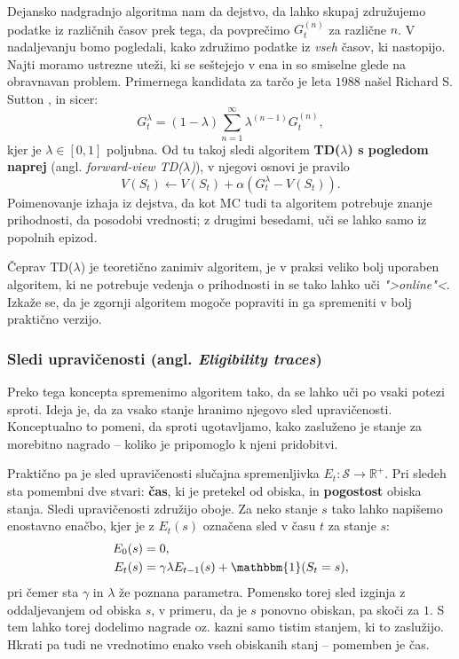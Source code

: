 \documentclass[12pt,a4paper]{amsart}
\theoremstyle{definition} %
\theoremstyle{plain} %
\begin{document}
Dejansko nadgradnjo algoritma nam da dejstvo, da lahko skupaj združujemo podatke iz različnih časov 
prek tega, da povprečimo $G_t^{(n)}$ za različne $n$. V nadaljevanju bomo pogledali, kako združimo 
podatke iz \textit{vseh} časov, ki nastopijo. Najti moramo ustrezne uteži, ki se seštejejo v ena in so 
smiselne glede na obravnavan problem. Primernega kandidata za tarčo je leta $1988$ našel Richard S. 
Sutton \cite{TDlambda}, in sicer:
$$
G_t^\lambda = (1 - \lambda) \sum_{n=1}^\infty \lambda^{(n-1)} G_t^{(n)},
$$
kjer je $\lambda \in [0, 1]$ poljubna. Od tu takoj sledi algoritem \textbf{TD($\lambda$) s pogledom 
naprej} (angl. \textit{forward-view TD($\lambda$)}), v njegovi osnovi je pravilo 
$$
V(S_t) \leftarrow V(S_t) + \alpha (G_t^\lambda - V(S_t)).
$$ 
Poimenovanje izhaja iz dejstva, da kot MC tudi ta algoritem potrebuje znanje prihodnosti, da posodobi 
vrednosti; z drugimi besedami, uči se lahko samo iz popolnih epizod.

Čeprav TD($\lambda$) je teoretično zanimiv algoritem, je v praksi veliko bolj uporaben algoritem, 
ki ne potrebuje vedenja o prihodnosti in se tako lahko uči \textit{">online"<}. Izkaže se, da je 
zgornji algoritem mogoče popraviti in ga spremeniti v bolj praktično verzijo.

\subsubsection{Sledi upravičenosti (angl. \textit{Eligibility traces})}
Preko tega koncepta spremenimo algoritem tako, da se lahko uči po vsaki potezi sproti. Ideja 
je, da za vsako stanje hranimo njegovo sled upravičenosti. Konceptualno to pomeni, da sproti 
ugotavljamo, kako zasluženo je stanje za morebitno nagrado -- koliko je pripomoglo k njeni 
pridobitvi.

Praktično pa je sled upravičenosti slučajna spremenljivka $E_t: \mathcal{S} \rightarrow \mathbb{R}^+$. 
Pri sledeh sta pomembni dve stvari: \textbf{čas}, ki je pretekel od obiska, in \textbf{pogostost} 
obiska stanja. Sledi upravičenosti združijo oboje. Za neko stanje $s$ tako lahko napišemo enostavno 
enačbo, kjer je z $E_t(s)$ označena sled v času $t$ za stanje $s$:
\begin{align*}
    E_0(s) &= 0, \\
    E_t(s) &= \gamma \lambda E_{t-1}(s) + \mathbbm{1}(S_t = s),
\end{align*}
pri čemer sta $\gamma$ in $\lambda$ že poznana parametra. Pomensko torej sled izginja z oddaljevanjem 
od obiska $s$, v primeru, da je $s$ ponovno obiskan, pa skoči za $1$. S tem lahko torej dodelimo 
nagrade oz. kazni samo tistim stanjem, ki to zaslužijo. Hkrati pa tudi ne vrednotimo enako vseh 
obiskanih stanj -- pomemben je čas.
\end{document}
